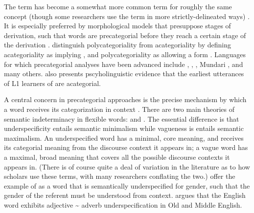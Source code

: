 The term  has become a somewhat more common term for roughly the same concept (though some researchers use the term in more strictly-delineated ways) \parencites[357, 362--364]{EvansOsada2005}{Bisang2008a}{Bisang2008b}{Bisang2013}. It is especially preferred by morphological models that presuppose stages of derivation, such that words are precategorial before they reach a certain stage of the derivation \parencites{HalleMarantz1993}{Arad2005} . \textcite[5]{VapnarksyVeneziano2017} distinguish polycategoriality from acategoriality by defining acategoriality as implying , and polycategoriality as allowing a form . Languages for which precategorial analyses have been advanced include  \parencite{Haag2017},  \parencite{McGregor2013},  \parencite{FranchettoSantos2017}, Mundari \parencite{HengeveldRijkhoff2005}, and many others. \textcite{Pfeiler2006} also presents pscyholinguistic evidence that the earliest utterances of L1 learners of  are acategorial.

A central concern in precategorial approaches is the precise mechanism by which a word receives its categorization in context \parencite[Sec.~3.7]{HengeveldRijkhoffSiewierska2004}. There are two main theories of semantic indeterminacy in flexible words:  \parencites{Farrell2001}{RijkhoffLier2013} and  \parencites{Tuggy1993}{HengeveldRijkhoffSiewierska2004}{HengeveldRijkhoff2005}. The essential difference is that underspecificity entails semantic minimalism while vagueness is entails semantic maximalism. An underspecified word has a minimal, core meaning, and receives its categorial meaning from the discourse context it appears in; a vague word has a maximal, broad meaning that covers all the possible discourse contexts it appears in. (There is of course quite a deal of variation in the literature as to how scholars use these terms, with many researchers conflating the two.) \textcite[414]{HengeveldRijkhoff2005} offer the example of  as a word that is semantically underspecified for gender, such that the gender of the referent must be understood from context. \textcite{Denison2018} argues that the English word  exhibits adjective {\textasciitilde} adverb underspecification in Old and Middle English.

